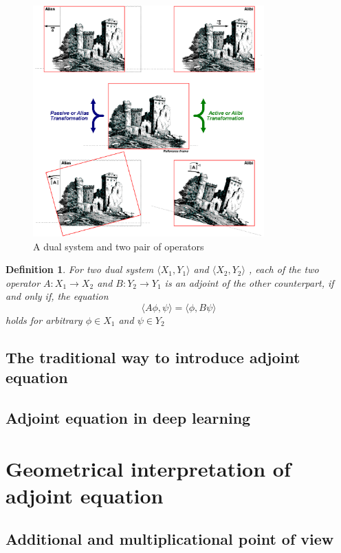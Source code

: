 \documentclass{article}
\newtheorem{definition}{Definition}
\begin{document}
\begin{figure}[ht]
\centering
\includegraphics[width=3.5in]{../images/adjoint/alias_and_alibi.png}
\caption{A dual system and two pair of operators}
\end{figure}

\begin{definition}
\label{d1}
For two dual system $ \langle X_1, Y_1 \rangle $ and $ \langle X_2, Y_2 \rangle $ , each of the two operator $ A : X_1 \to X_2$ and $ B : Y_2 \to Y_1 $ is an adjoint of the other counterpart,
if and only if, the equation $$ \langle A \phi, \psi \rangle = \langle \phi, B \psi \rangle $$ holds for arbitrary $ \phi \in X_1 $ and $ \psi \in Y_2 $
\end{definition}

\subsection{The traditional way to introduce adjoint equation}

\subsection{Adjoint equation in deep learning}

\section{Geometrical interpretation of adjoint equation}

\subsection{Additional and multiplicational point of view}
\end{document}
